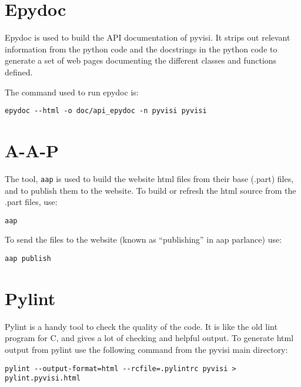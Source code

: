 \documentclass[12pt,a4paper]{article}
\begin{document}
\section{Epydoc}

Epydoc is used to build the API documentation of pyvisi.  It strips out
relevant information from the python code and the docstrings in the python
code to generate a set of web pages documenting the different classes and
functions defined.

The command used to run epydoc is:
\begin{verbatim}
epydoc --html -o doc/api_epydoc -n pyvisi pyvisi
\end{verbatim}

\section{A-A-P}

The tool, \texttt{aap} is used to build the website html files from their base
(.part) files, and to publish them to the website.  To build or refresh the
html source from the .part files, use:
\begin{verbatim}
aap
\end{verbatim}
To send the files to the website (known as ``publishing'' in aap parlance)
use:
\begin{verbatim}
aap publish
\end{verbatim}

\section{Pylint}

Pylint is a handy tool to check the quality of the code.  It is like the old
lint program for C, and gives a lot of checking and helpful output.  To
generate html output from pylint use the following command from the pyvisi
main directory:
\begin{verbatim}
pylint --output-format=html --rcfile=.pylintrc pyvisi > pylint.pyvisi.html
\end{verbatim}
\end{document}
